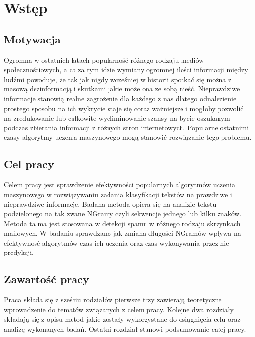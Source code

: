 \chapter*{Wstęp}
\section*{Motywacja}
Ogromna w ostatnich latach popularność różnego rodzaju mediów społecznościowych, a co za tym 
idzie wymiany ogromnej ilości informacji między ludźmi powoduje, że tak jak nigdy wcześniej 
w historii spotkać się można z masową dezinformacją i skutkami jakie może ona ze sobą nieść.
Nieprawdziwe informacje stanowią realne zagrożenie dla każdego z nas dlatego odnalezienie 
prostego sposobu na ich wykrycie staje się coraz ważniejsze i mogłoby pozwolić na 
zredukowanie lub całkowite wyeliminowanie szansy na bycie oszukanym podczas zbierania
informacji z różnych stron internetowych. Popularne ostatnimi czasy algorytmy uczenia 
maszynowego mogą stanowić rozwiązanie tego problemu.
\section*{Cel pracy}
Celem pracy jest sprawdzenie efektywności popularnych algorytmów uczenia maszynowego w rozwiązywaniu 
zadania klasyfikacji tekstów na prawdziwe i nieprawdziwe informacje. Badana metoda opiera 
się na analizie tekstu podzielonego na tak zwane NGramy czyli sekwencje jednego lub kilku znaków.
Metoda ta ma jest stosowana w detekcji spamu w różnego rodzaju skrzynkach mailowych.
W badaniu sprawdzano jak zmiana długości NGramów wpływa na efektywność algorytmów czas ich 
uczenia oraz czas wykonywania przez nie predykcji. 
\section*{Zawartość pracy}
Praca składa się z sześciu rodziałów pierwsze trzy zawierają teoretyczne wprowadzenie 
do tematów związanych z celem pracy. Kolejne dwa rozdziały składają się z opisu metod jakie 
zostały wykorzystane do osiągnięcia celu oraz analizę wykonanych badań. Ostatni rozdział 
stanowi podsumowanie całej pracy.

